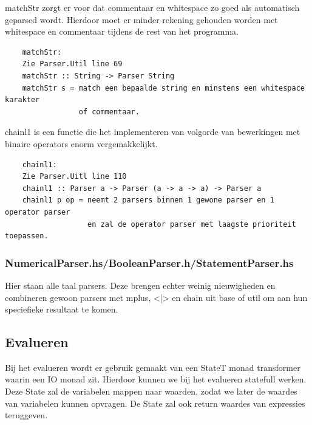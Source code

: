 \documentclass[a4paper,10pt]{article}
\begin{document}
      matchStr zorgt er voor dat commentaar en whitespace zo goed als automatisch geparsed wordt. Hierdoor moet er minder rekening gehouden worden met whitespace en commentaar tijdens de rest van het programma. 
        \begin{lstlisting}
    matchStr:
    Zie Parser.Util line 69
    matchStr :: String -> Parser String
    matchStr s = match een bepaalde string en minstens een whitespace karakter 
                 of commentaar.
        \end{lstlisting}
        
    chainl1 is een functie die het implementeren van volgorde van bewerkingen met binaire operators enorm vergemakkelijkt.  
        \begin{lstlisting}
    chainl1:
    Zie Parser.Uitl line 110
    chainl1 :: Parser a -> Parser (a -> a -> a) -> Parser a
    chainl1 p op = neemt 2 parsers binnen 1 gewone parser en 1 operator parser 
                   en zal de operator parser met laagste prioriteit toepassen.
        \end{lstlisting}
    \subsubsection{NumericalParser.hs/BooleanParser.h/StatementParser.hs}
    Hier staan alle taal parsers. Deze brengen echter weinig nieuwigheden en
    combineren gewoon parsers met mplus, <|> en chain 
    uit base of util om aan hun speciefieke resultaat te komen.

  \subsection{Evalueren}
    Bij het evalueren wordt er gebruik gemaakt van een StateT monad transformer waarin een IO monad zit.
    Hierdoor kunnen we bij het evalueren statefull werken. Deze State zal de variabelen mappen naar waarden,
    zodat we later de waardes van variabelen kunnen opvragen.
    De State zal ook return waardes van expressies teruggeven.
    
\end{document}
